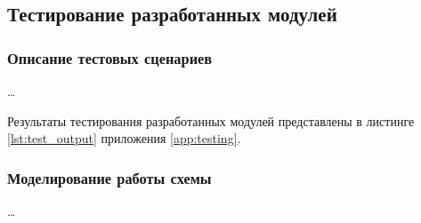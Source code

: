 \subsection{Тестирование разработанных модулей}

\subsubsection{Описание тестовых сценариев}

\dots

Результаты тестирования разработанных модулей представлены в листинге \ref{lst:test_output} приложения \ref{app:testing}.

\subsubsection{Моделирование работы схемы}

\dots